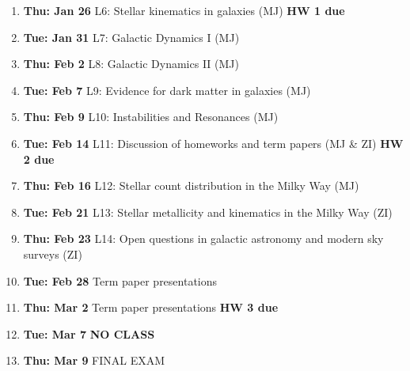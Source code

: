 \documentclass[12pt]{article}
\begin{document}
\begin{enumerate}
  \item {\bf Thu: Jan 26}  L6: Stellar kinematics in galaxies (MJ) {\bf HW 1 due}
  \item {\bf Tue: Jan 31}  L7: Galactic Dynamics I (MJ)
  \item {\bf Thu: Feb 2}   L8: Galactic Dynamics II (MJ)
  \item {\bf Tue: Feb 7}   L9: Evidence for dark matter in galaxies (MJ)
  \item {\bf Thu: Feb 9}   L10: Instabilities and Resonances (MJ)
  \item {\bf Tue: Feb 14}  L11: Discussion of homeworks and term papers (MJ \& ZI) {\bf HW 2 due}
  \item {\bf Thu: Feb 16}  L12: Stellar count distribution in the Milky Way (MJ)
  \item {\bf Tue: Feb 21}  L13: Stellar metallicity and kinematics in the Milky Way (ZI)
  \item {\bf Thu: Feb 23}  L14: Open questions in galactic astronomy and modern sky surveys (ZI)
  \item {\bf Tue: Feb 28}  Term paper presentations
  \item {\bf Thu: Mar  2}  Term paper presentations {\bf HW 3 due}
  \item {\bf Tue: Mar  7}  {\bf NO CLASS}
  \item {\bf Thu: Mar 9}   FINAL EXAM
\end{enumerate}
\end{document}
